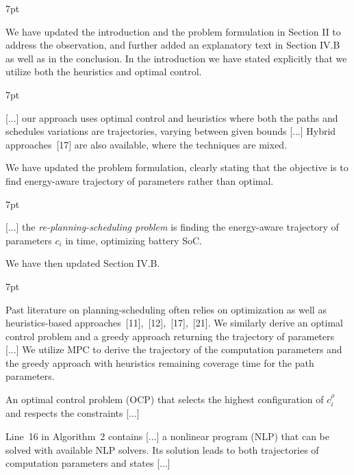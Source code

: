 \documentclass[10pt]{letter}
\newenvironment{formal}{%
  \def\FrameCommand{%
    \hspace{1pt}%
    {\color{red}\vrule width 2pt}%
    {\color{formalshade}\vrule width 4pt}%
    \colorbox{formalshade}%
  }%
  \MakeFramed{\advance\hsize-\width\FrameRestore}%
  \noindent\hspace{-4.55pt}%
  \begin{adjustwidth}{}{7pt}%
  \vspace{2pt}\vspace{2pt}%
}
{%
  \vspace{2pt}\end{adjustwidth}\endMakeFramed%
}
\begin{document}
{\begin{formal}
\begin{algorithmic}[1]
    \vspace*{.8ex}
  \end{algorithmic}
\end{formal}

  We have updated the introduction and the problem formulation in Section II to address the observation, and further added an explanatory text in Section IV.B as well as in the conclusion. In the introduction we have stated explicitly that we utilize both the heuristics and optimal control.

  \begin{formal}
  {\color{black} [...] our approach uses optimal control {\color{blue} and heuristics} where both the paths and schedules variations are trajectories, varying between given bounds [...]} Hybrid approaches~[{\color{green}17}] are also available, where the techniques are mixed.
  \vspace*{1ex}
  \end{formal}

  We have updated the problem formulation, clearly stating that the objective is to find energy-aware trajectory of parameters rather than optimal.

  \begin{formal}
    {\color{black} [...] the \emph{re-planning-scheduling problem} is finding the {\color{blue}energy-aware} trajectory of parameters $c_i$ in time{\color{blue}, optimizing battery SoC}.}
    \vspace*{1ex}
  \end{formal}

  We have then updated Section IV.B.

  \begin{formal}
  \color{black}
  Past literature on planning-scheduling often relies on %
  optimization {\color{blue} as well as heuristics-based} approaches~[{\color{green}11}],~[{\color{green}12}],~[{\color{green}17}],~[{\color{green}21}]. We similarly derive an optimal control problem {\color{blue}and a greedy approach} returning the trajectory of parameters [...] {\color{blue} We utilize MPC to derive the trajectory of the computation parameters and the greedy approach with heuristics remaining coverage time for the path parameters.}

  An optimal control problem (OCP) that selects the highest configuration of {\color{blue} $c_i^\rho$} and respects the constraints [...]

  Line~{\color{red}16} in Algorithm~{\color{red}2} contains [...] a nonlinear program (NLP) that can be solved with available NLP solvers. Its solution leads to both trajectories of {\color{blue} computation} parameters and states [...]
  

\end{formal}}
\end{document}
